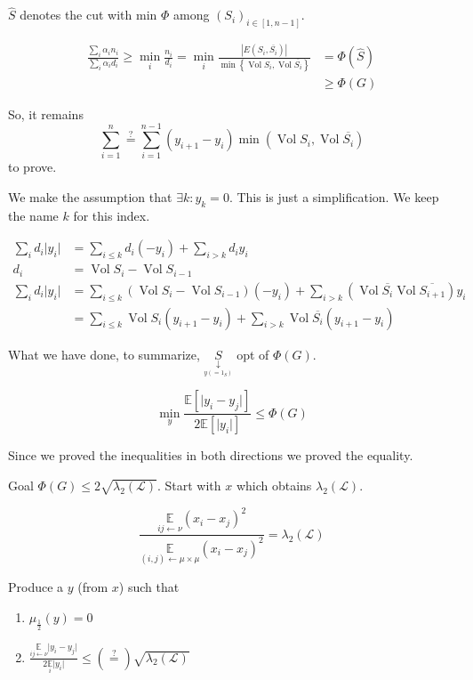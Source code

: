 \documentclass[12pt]{article}
\newcommand{\EE}{\mathbb{E}}
\renewcommand{\L}{\mathcal{L}}
\newcommand{\set}[1]{\left\{ #1 \right\}}
\newcommand{\brackets}[1]{\left[ #1 \right]}
\newcommand{\la}{\leftarrow}
\newcommand{\card}[1]{\left\lvert#1\right\rvert}
\newcommand{\esp}[2][]{\underset{#1}{\EE}\left[ #2 \right]}
\DeclareMathOperator{\vol}{Vol}
\begin{document}
$\hat{S}$ denotes the cut with min $\Phi$ among $(S_i)_{i\in\brackets{1,n-1}}$.


\[
    \begin{aligned}
        \frac{\sum\limits_i \alpha_i n_i}{\sum\limits_i \alpha_i d_i} \geqslant \min\limits_i \frac{n_i}{d_i} = \min_i \frac{\card{E(S_i,\overline{S_i})}}{\min\set{\vol S_i,\vol \overline{S_i}}} &= \Phi(\hat{S})\\
        &\geqslant \Phi(G)
    \end{aligned}
\]

So, it remains 
\[
    \sum\limits_{i=1}^n \overset{?}{=} \sum\limits_{i=1}^{n-1} (y_{i+1} - y_i) \min(\vol S_i, \vol \overline{S_i})
\]
to prove.



We make the assumption that $\exists k : y_k = 0$. This is just a simplification. We keep the name $k$ for this index.

\[
    \begin{aligned}
        \sum\limits_i d_i\lvert y_i \rvert &= \sum\limits_{i\leqslant k} d_i(-y_i) + \sum\limits_{i > k}d_i y_i\\
       d_i &= \vol S_i - \vol S_{i-1}\\
       \sum\limits_i d_i\lvert y_i \rvert &= \sum\limits_{i\leqslant k} (\vol S_i - \vol S_{i-1})(-y_i) + \sum\limits_{i>k} \left(\vol \overline{S_i} \vol \overline{S_{i+1}} \right)y_i\\
       &= \sum\limits_{i\leqslant k} \vol S_i (y_{i+1} -y_i) + \sum\limits_{i>k} \vol \overline{S_i} (y_{i+1} - y_i)
    \end{aligned}
\]

What we have done, to summarize, $\underset{\underset{y(=1_S)}{\downarrow}}{S}$ opt of $\Phi(G)$.

\[
    \min\limits_y \frac{\esp{\lvert y_i-y_j\rvert}}{2\esp{\lvert y_i \rvert}} \leqslant \Phi(G)
\]

Since we proved the inequalities in both directions we proved the equality.

Goal $\Phi(G) \leqslant 2\sqrt{\lambda_2(\L)}$. Start with $x$ which obtains $\lambda_2(\L)$.

\[
    \frac{\underset{ij\la \nu}{\EE}(x_i-x_j)^2}{\underset{(i,j)\la\mu\times\mu}{\EE}(x_i-x_j)^2} = \lambda_2(\L)
\]

Produce a $y$ (from $x$) such that
\begin{enumerate}[(1)]
    \item $\mu_{\frac{1}{2}}(y) = 0$
    \item $\frac{\underset{ij\la\nu}{\EE}\lvert y_i-y_j\rvert}{2\underset{i}{\EE}\lvert y_i \rvert} \leqslant (\overset{?}{=}) \sqrt{\lambda_2(\L)}$
\end{enumerate}
\end{document}
